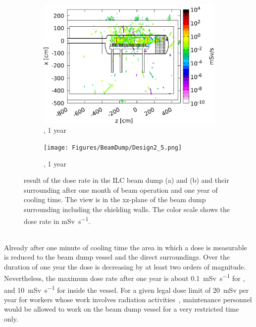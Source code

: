 \begin{figure}[!h]
 \centering
    \begin{subfigure}[b]{0.49\textwidth}
   \centering
    \includegraphics[width=\textwidth]{Figures/BeamDump/Design1_5.png}
   \caption{\designone, 1 year}
   \end{subfigure} 
   \hfill
    \begin{subfigure}[b]{0.49\textwidth}
   \centering
    \texttt{[image: Figures/BeamDump/Design2\_5.png]}
   \caption{\designtwo, 1 year}
   \end{subfigure}
   \caption[Dose rate in the ILC main beam dump after one year]{\fluka result of the dose rate in the ILC beam dump \designone (a) and \designtwo (b) and their surrounding after one month of beam operation and one year of cooling time.
   The view is in the xz-plane of the beam dump surrounding including the shielding walls.
   The color scale shows the dose rate in \si{\milli\sievert\per\second}.}
   \label{fig:BeamDumps:DoseRate_1year}
\end{figure}
\\Already after one minute of cooling time the area in which a dose is measurable is reduced to the beam dump vessel and the direct surroundings.
Over the duration of one year the dose is decreasing by at least two orders of magnitude.
Nevertheless, the maximum dose rate after one year is about \SI{0.1}{\milli\sievert\per\second} for \designone, and \SI{10}{\milli\sievert\per\second} for \designtwo inside the vessel.
For a given legal dose limit of \SI{20}{\milli\sievert} per year for workers whose work involves radiation activities~\cite{Strahlenschutz}, maintenance personnel would be allowed to work on the beam dump vessel for a very restricted time only.
